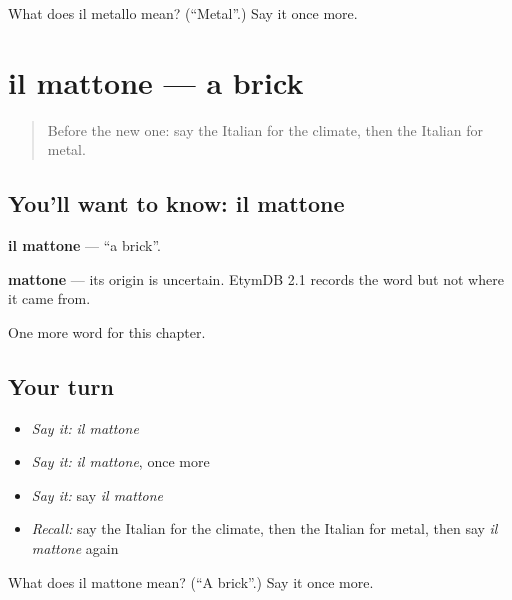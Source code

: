 \begin{tcolorbox}[breakable,colback=teal!4,colframe=teal!35!black,title={Before you move on}]
What does il metallo mean? (\textquotedblleft{}Metal\textquotedblright{}.) Say it once more.
\end{tcolorbox}
\section[il mattone]{il mattone — a brick}

\label{lesson:IT-C257-mattone}



\begin{quote}
Before the new one: say the Italian for the climate, then the Italian for metal.
\end{quote}

\subsection*{You'll want to know: il mattone}
\textbf{il mattone} — \textquotedblleft{}a brick\textquotedblright{}.

\begin{cousinweb}
\textbf{mattone} — its origin is uncertain. EtymDB 2.1 records the word but not where it came from.
\end{cousinweb}

\begin{grammarlens}[title={What you've built}]
One more word for this chapter.
\end{grammarlens}

\subsection*{Your turn}
\begin{itemize}
\raggedright
  \item \emph{Say it:} \emph{il mattone}
  \item \emph{Say it:} \emph{il mattone}, once more
  \item \emph{Say it:} say \emph{il mattone}
  \item \emph{Recall:} say the Italian for the climate, then the Italian for metal, then say \emph{il mattone} again
\end{itemize}

\begin{tcolorbox}[breakable,colback=teal!4,colframe=teal!35!black,title={Before you move on}]
What does il mattone mean? (\textquotedblleft{}A brick\textquotedblright{}.) Say it once more.
\end{tcolorbox}
